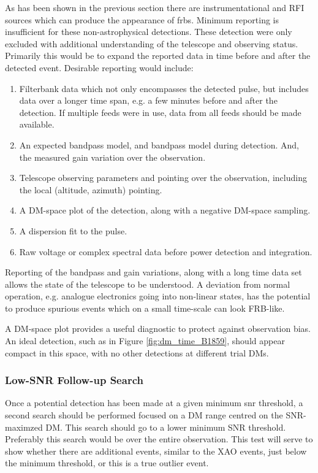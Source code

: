 \documentclass[a4paper,fleqn,usenatbib]{mnras}
\begin{document}
As has been shown in the previous section there are instrumentational and RFI
sources which can produce the appearance of \glspl{frb}. Minimum reporting is
insufficient for these non-astrophysical detections. These detection were only
excluded with additional understanding of the telescope and observing status.
Primarily this would be to expand the reported data in time before and after the
detected event. Desirable reporting would include:

\begin{enumerate}
    \item Filterbank data which not only encompasses the detected pulse, but
    includes data over a longer time span, e.g. a few minutes before and after
    the detection. If multiple feeds were in use, data from all feeds should be
    made available.
    \item An expected bandpass model, and bandpass model during detection. And,
    the measured gain variation over the observation.
    \item Telescope observing parameters and pointing over the observation,
    including the local (altitude, azimuth) pointing.
    \item A DM-space plot of the detection, along with a negative DM-space
    sampling.
    \item A dispersion fit to the pulse.
    \item Raw voltage or complex spectral data before power detection and
    integration.
\end{enumerate}

Reporting of the bandpass and gain variations, along with a long time data set
allows the state of the telescope to be understood. A deviation from normal
operation, e.g. analogue electronics going into non-linear states, has the
potential to produce spurious events which on a small time-scale can look
FRB-like.

A DM-space plot provides a useful diagnostic to protect against observation
bias. An ideal detection, such as in Figure \ref{fig:dm_time_B1859}, should
appear compact in this space, with no other detections at different trial DMs.

\subsubsection{Low-SNR Follow-up Search}

Once a potential detection has been made at a given minimum \gls{snr} threshold,
a second search should be performed focused on a DM range centred on the
SNR-maximzed DM. This search should go to a lower minimum SNR threshold.
Preferably this search would be over the entire observation. This test will
serve to show whether there are additional events, similar to the XAO events,
just below the minimum threshold, or this is a true outlier event.
\end{document}
